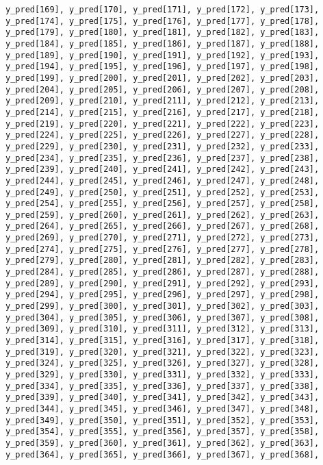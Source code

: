 \documentclass[
  letterpaper,
  DIV=11,
  numbers=noendperiod]{scrartcl}
\begin{document}
\begin{verbatim}
y_pred[169], y_pred[170], y_pred[171], y_pred[172], y_pred[173],
y_pred[174], y_pred[175], y_pred[176], y_pred[177], y_pred[178],
y_pred[179], y_pred[180], y_pred[181], y_pred[182], y_pred[183],
y_pred[184], y_pred[185], y_pred[186], y_pred[187], y_pred[188],
y_pred[189], y_pred[190], y_pred[191], y_pred[192], y_pred[193],
y_pred[194], y_pred[195], y_pred[196], y_pred[197], y_pred[198],
y_pred[199], y_pred[200], y_pred[201], y_pred[202], y_pred[203],
y_pred[204], y_pred[205], y_pred[206], y_pred[207], y_pred[208],
y_pred[209], y_pred[210], y_pred[211], y_pred[212], y_pred[213],
y_pred[214], y_pred[215], y_pred[216], y_pred[217], y_pred[218],
y_pred[219], y_pred[220], y_pred[221], y_pred[222], y_pred[223],
y_pred[224], y_pred[225], y_pred[226], y_pred[227], y_pred[228],
y_pred[229], y_pred[230], y_pred[231], y_pred[232], y_pred[233],
y_pred[234], y_pred[235], y_pred[236], y_pred[237], y_pred[238],
y_pred[239], y_pred[240], y_pred[241], y_pred[242], y_pred[243],
y_pred[244], y_pred[245], y_pred[246], y_pred[247], y_pred[248],
y_pred[249], y_pred[250], y_pred[251], y_pred[252], y_pred[253],
y_pred[254], y_pred[255], y_pred[256], y_pred[257], y_pred[258],
y_pred[259], y_pred[260], y_pred[261], y_pred[262], y_pred[263],
y_pred[264], y_pred[265], y_pred[266], y_pred[267], y_pred[268],
y_pred[269], y_pred[270], y_pred[271], y_pred[272], y_pred[273],
y_pred[274], y_pred[275], y_pred[276], y_pred[277], y_pred[278],
y_pred[279], y_pred[280], y_pred[281], y_pred[282], y_pred[283],
y_pred[284], y_pred[285], y_pred[286], y_pred[287], y_pred[288],
y_pred[289], y_pred[290], y_pred[291], y_pred[292], y_pred[293],
y_pred[294], y_pred[295], y_pred[296], y_pred[297], y_pred[298],
y_pred[299], y_pred[300], y_pred[301], y_pred[302], y_pred[303],
y_pred[304], y_pred[305], y_pred[306], y_pred[307], y_pred[308],
y_pred[309], y_pred[310], y_pred[311], y_pred[312], y_pred[313],
y_pred[314], y_pred[315], y_pred[316], y_pred[317], y_pred[318],
y_pred[319], y_pred[320], y_pred[321], y_pred[322], y_pred[323],
y_pred[324], y_pred[325], y_pred[326], y_pred[327], y_pred[328],
y_pred[329], y_pred[330], y_pred[331], y_pred[332], y_pred[333],
y_pred[334], y_pred[335], y_pred[336], y_pred[337], y_pred[338],
y_pred[339], y_pred[340], y_pred[341], y_pred[342], y_pred[343],
y_pred[344], y_pred[345], y_pred[346], y_pred[347], y_pred[348],
y_pred[349], y_pred[350], y_pred[351], y_pred[352], y_pred[353],
y_pred[354], y_pred[355], y_pred[356], y_pred[357], y_pred[358],
y_pred[359], y_pred[360], y_pred[361], y_pred[362], y_pred[363],
y_pred[364], y_pred[365], y_pred[366], y_pred[367], y_pred[368],

\end{verbatim}
\end{document}
